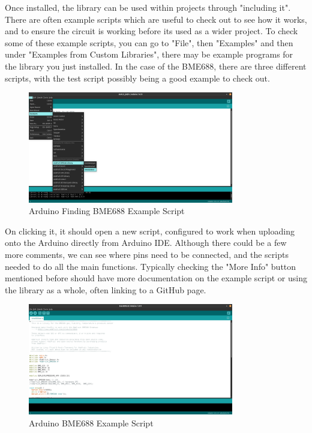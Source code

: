 \documentclass[a4paper,11pt]{report}
\begin{document}
Once installed, the library can be used within projects through "including it". There are often example scripts which are useful to check out to see how it works, and to ensure the circuit is working before its used as a wider project. To check some of these example scripts, you can go to "File", then "Examples" and then under "Examples from Custom Libraries", there may be example programs for the library you just installed. In the case of the BME688, there are three different scripts, with the test script possibly being a good example to check out.

\begin{figure}[H]
\centering
\includegraphics[width=0.8\textwidth]{screenshots/arduinobme688examplescriptfind}
\caption{Arduino Finding BME688 Example Script}
\end{figure}

On clicking it, it should open a new script, configured to work when uploading onto the Arduino directly from Arduino IDE. Although there could be a few more comments, we can see where pins need to be connected, and the scripts needed to do all the main functions. Typically checking the "More Info" button mentioned before should have more documentation on the example script or using the library as a whole, often linking to a GitHub page.

\begin{figure}[H]
\centering
\includegraphics[width=0.8\textwidth]{screenshots/arduinobme688examplescript}
\caption{Arduino BME688 Example Script}
\end{figure}
\end{document}
